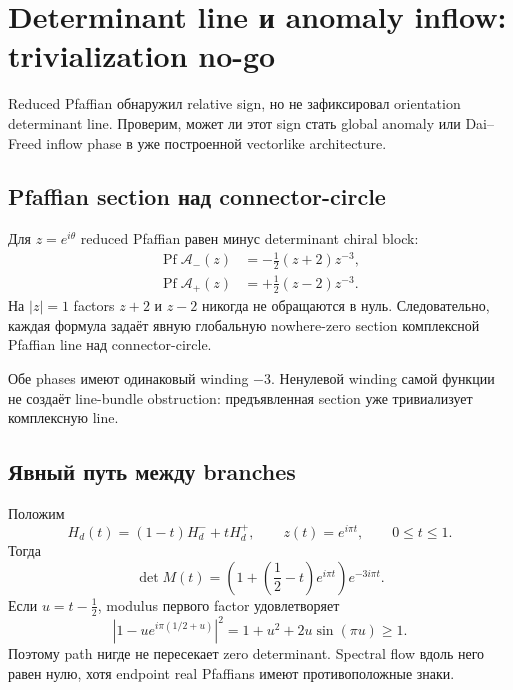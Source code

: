 \chapter{Determinant line и anomaly inflow: trivialization no-go}

Reduced Pfaffian обнаружил relative sign, но не зафиксировал orientation
determinant line. Проверим, может ли этот sign стать global anomaly или
Dai--Freed inflow phase в уже построенной vectorlike architecture.

\section{Pfaffian section над connector-circle}

Для \(z=e^{i\theta}\) reduced Pfaffian равен минус determinant chiral block:
\begin{align}
 \operatorname{Pf}\mathcal A_-(z)
 &=-\frac12(z+2)z^{-3},\\
 \operatorname{Pf}\mathcal A_+(z)
 &=+\frac12(z-2)z^{-3}.
\end{align}
На \(|z|=1\) factors \(z+2\) и \(z-2\) никогда не обращаются в нуль.
Следовательно, каждая формула задаёт явную глобальную nowhere-zero section
комплексной Pfaffian line над connector-circle.

Обе phases имеют одинаковый winding \(-3\). Ненулевой winding самой функции
не создаёт line-bundle obstruction: предъявленная section уже
тривиализует комплексную line.

\section{Явный путь между branches}

Положим
\begin{equation}
 H_d(t)=(1-t)H_d^-+tH_d^+,
 \qquad
 z(t)=e^{i\pi t},
 \qquad 0\le t\le1.
\end{equation}
Тогда
\begin{equation}
 \det M(t)
 =
 \left(
 1+\left(\frac12-t\right)e^{i\pi t}
 \right)e^{-3i\pi t}.
\end{equation}
Если \(u=t-\frac12\), modulus первого factor удовлетворяет
\begin{equation}
 \left|1-u e^{i\pi(1/2+u)}\right|^2
 =
 1+u^2+2u\sin(\pi u)
 \ge1.
\end{equation}
Поэтому path нигде не пересекает zero determinant. Spectral flow вдоль него
равен нулю, хотя endpoint real Pfaffians имеют противоположные знаки.

